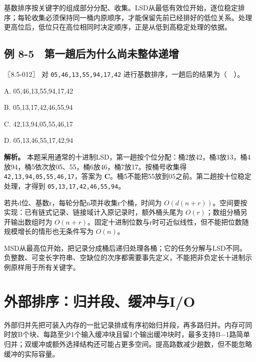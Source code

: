 基数排序按关键字的组成部分分配、收集。LSD从最低有效位开始，逐位稳定排序；每轮收集必须保持同一桶内原顺序，才能保留先前已经排好的低位关系。处理更高位后，低位只在高位相同时决定顺序，正是从低到高稳定处理的依据。


\subsection{例 8-5　第一趟后为什么尚未整体递增}\label{ds-ex8-5}

\noindent{}〖8.5-012〗 对 \allowbreak{}\texttt{05,}\allowbreak{}\texttt{46,}\allowbreak{}\texttt{13,}\allowbreak{}\texttt{55,}\allowbreak{}\texttt{94,}\allowbreak{}\texttt{17,}\allowbreak{}\texttt{42} 进行基数排序，一趟后的结果为（　）。

A. 05,46,13,55,94,17,42

B. 05,13,17,42,46,55,94

C. 42,13,94,05,55,46,17

D. 05,13,46,55,17,42,94


\textbf{解析。} 本题采用通常的十进制LSD，第一趟按个位分配：桶2放42，桶3放13，桶4放94，桶5依次放05、55，桶6放46，桶7放17。按桶号收集得 \allowbreak{}\texttt{42,}\allowbreak{}\texttt{13,}\allowbreak{}\texttt{94,}\allowbreak{}\texttt{05,}\allowbreak{}\texttt{55,}\allowbreak{}\texttt{46,}\allowbreak{}\texttt{17}，答案为 \textbf{C}。桶5不能把55放到05之前。第二趟按十位稳定处理，才得到 \allowbreak{}\texttt{05,}\allowbreak{}\texttt{13,}\allowbreak{}\texttt{17,}\allowbreak{}\texttt{42,}\allowbreak{}\texttt{46,}\allowbreak{}\texttt{55,}\allowbreak{}\texttt{94}。

若共d位、基数r，每轮分配n项并收集r个桶，时间为 \(O(d(n+r))\)。空间要按实现：已有链式记录、链接域计入原记录时，额外桶头尾为 \(O(r)\)；数组分桶另开输出数组时为 \(O(n+r)\)。固定十进制位数与r时可近似线性，但不能把位数随规模增长的情形也无条件写为 \(O(n)\)。

MSD从最高位开始，把记录分成桶后递归处理各桶；它的任务分解与LSD不同。负整数、可变长字符串、空缺位的次序都需要事先定义，不能把非负定长十进制示例原样用于所有关键字。

\section{外部排序：归并段、缓冲与I/O}\label{ds-08-10}

外部归并先把可装入内存的一批记录排成有序初始归并段，再多路归并。内存可同时放B个块、每路至少1个输入缓冲块且留1个输出缓冲块时，最多支持B−1路简单归并；双缓冲或额外选择结构还可能占更多空间。提高路数减少趟数，但不能忽略缓冲的实际容量。

